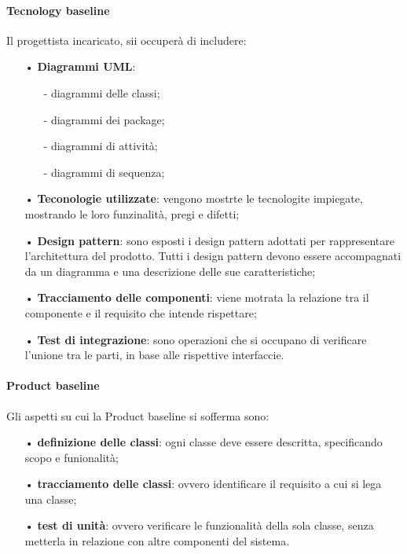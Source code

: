 			\paragraph{Tecnology baseline}\newline \newline
			Il progettista incaricato, sii occuperà di includere:
			\begin{itemize}
				\item[•] \textbf{Diagrammi UML}:
				\begin{itemize}
					\item[-] diagrammi delle classi;
					\item[-] diagrammi dei package;
					\item[-] diagrammi di attività;
					\item[-] diagrammi di sequenza;
				\end{itemize}
				\item[•] \textbf{Teconologie utilizzate}: vengono mostrte le tecnologite impiegate, mostrando le loro funzinalità, pregi e difetti;
				\item[•] \textbf{Design pattern}\glo : sono esposti i design pattern adottati per rappresentare l'architettura del prodotto. Tutti i design pattern devono essere accompagnati da un diagramma e una descrizione delle sue caratteristiche;
				\item[•] \textbf{Tracciamento delle componenti}: viene motrata la relazione tra il componente e il requisito che intende rispettare; 
				\item[•] \textbf{Test di integrazione}: sono operazioni che si occupano di verificare l'unione tra le parti, in base alle rispettive interfaccie.
			\end{itemize}
			\paragraph{Product baseline}\newline \newline
			Gli aspetti su cui la  Product baseline si sofferma sono:
				\begin{itemize}
					\item[•] \textbf{definizione delle classi}: ogni classe deve essere descritta, specificando scopo e funionalità;
					\item[•] \textbf{tracciamento delle classi}: ovvero identificare il requisito a cui si lega una classe;
					\item[•] \textbf{test di unità}: ovvero verificare le funzionalità della sola classe, senza metterla in relazione con altre componenti del sistema.
				\end{itemize}
